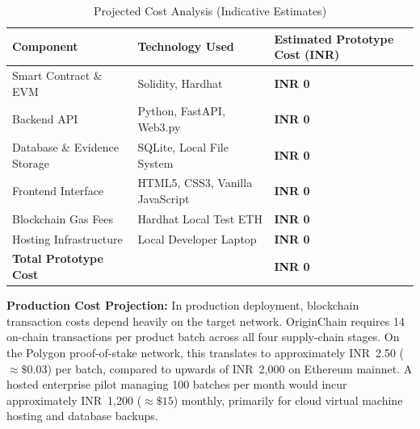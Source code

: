 \documentclass[12pt,a4paper]{report}
\begin{document}
\begin{table}[H]
\centering
\caption{Projected Cost Analysis (Indicative Estimates)}
\label{tab:cost}
\small
\begin{tabularx}{\textwidth}{p{4.5cm} p{4.5cm} X}
\toprule
\textbf{Component} & \textbf{Technology Used} & \textbf{Estimated Prototype Cost (INR)} \\
\midrule
Smart Contract \& EVM & Solidity, Hardhat & \textbf{INR 0} \\
Backend API & Python, FastAPI, Web3.py & \textbf{INR 0} \\
Database \& Evidence Storage & SQLite, Local File System & \textbf{INR 0} \\
Frontend Interface & HTML5, CSS3, Vanilla JavaScript & \textbf{INR 0} \\
Blockchain Gas Fees & Hardhat Local Test ETH & \textbf{INR 0} \\
Hosting Infrastructure & Local Developer Laptop & \textbf{INR 0} \\
\midrule
\textbf{Total Prototype Cost} & & \textbf{INR 0} \\
\bottomrule
\end{tabularx}
\end{table}

\noindent \textbf{Production Cost Projection:}
In production deployment, blockchain transaction costs depend heavily on the target network. OriginChain requires 14 on-chain transactions per product batch across all four supply-chain stages. On the Polygon proof-of-stake network, this translates to approximately INR~2.50 ($\approx \$0.03$) per batch, compared to upwards of INR~2,000 on Ethereum mainnet. A hosted enterprise pilot managing 100 batches per month would incur approximately INR~1,200 ($\approx \$15$) monthly, primarily for cloud virtual machine hosting and database backups.
\end{document}

